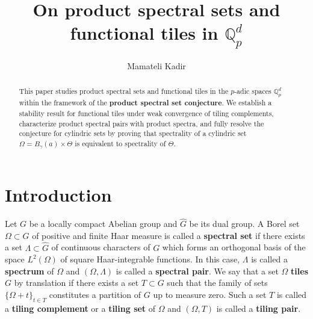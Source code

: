 \documentclass[a4paper,12pt]{amsart}
\def\Q{\mathbb{Q}}
\begin{document}
\title{On  product spectral sets and functional tiles in $\Q_p^d$}

\author{Mamateli Kadir}
\address{School of Mathematics and Statistics \& Research Center of Modern Mathematics and Applications,
Kashi University, Kashi, 844006, P. R. China}




\begin{abstract}
This paper studies product spectral sets and functional tiles in the $p$-adic spaces $\mathbb{Q}_p^d$
within the framework of the {\bf product spectral set conjecture}. We establish  a stability result for functional
tiles under weak convergence of tiling complements, characterize product spectral pairs
with product spectra, and fully resolve the conjecture for cylindric sets by proving that
spectrality of a cylindric set $\Omega=B_\gamma(a)\times\Theta$ is equivalent to spectrality of $\Theta$.
\end{abstract}



\maketitle

\section{Introduction}

Let $G$ be a locally compact Abelian group and $\widehat{G}$  be its dual group.
A Borel set  $\Omega\subset G$ of positive and finite Haar measure is called a {\bf spectral set}
if there exists a set $\Lambda \subset \widehat G$ of continuous characters of $G$ which forms
an orthogonal basis of the space $L^2(\Omega)$ of square Haar-integrable functions.
In this case, $\Lambda$ is called a {\bf spectrum} of $\Omega$ and $(\Omega,\Lambda)$ is called
a {\bf spectral pair}.
We say that a set $\Omega$ {\bf tiles} $G$ by translation if there exists a set $T\subset G$
such that the family of sets $\{\Omega+t\}_{t\in T}$ constitutes a partition of $G$ up to measure zero.
Such a set $T$  is called a {\bf tiling complement} or a  {\bf tiling set} of $\Omega$ and
$(\Omega,T)$ is called a {\bf tiling pair}.
\end{document}
